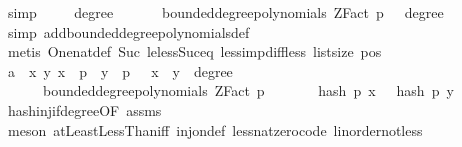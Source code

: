 \begin{isabellebody}
\ simp\isanewline
\ \ \isamarkupfalse%
\ {\isachardoublequoteopen}{\isasymAnd}{\isasymomega}{\isachardot}{\kern0pt}\ degree\ {\isasymomega}\ {\isasymge}\ {}\ {\isasymLongrightarrow}\ {\isasymomega}\ {\isasymin}\ bounded{\isacharunderscore}{\kern0pt}degree{\isacharunderscore}{\kern0pt}polynomials\ {\isacharparenleft}{\kern0pt}ZFact\ p{\isacharparenright}{\kern0pt}\ {}\ {\isasymLongrightarrow}\ degree\ {\isasymomega}\ {\isacharequal}{\kern0pt}\ {}{\isachardoublequoteclose}\isanewline
\ \ \ \ \isamarkupfalse%
\ {\isacharparenleft}{\kern0pt}simp\ add{\isacharcolon}{\kern0pt}bounded{\isacharunderscore}{\kern0pt}degree{\isacharunderscore}{\kern0pt}polynomials{\isacharunderscore}{\kern0pt}def{\isacharparenright}{\kern0pt}\ \isanewline
\ \ \ \ \isamarkupfalse%
\ {\isacharparenleft}{\kern0pt}metis\ One{\isacharunderscore}{\kern0pt}nat{\isacharunderscore}{\kern0pt}def\ Suc{\isacharunderscore}{\kern0pt}{}\ le{\isacharunderscore}{\kern0pt}less{\isacharunderscore}{\kern0pt}Suc{\isacharunderscore}{\kern0pt}eq\ less{\isacharunderscore}{\kern0pt}imp{\isacharunderscore}{\kern0pt}diff{\isacharunderscore}{\kern0pt}less\ list{\isachardot}{\kern0pt}size{\isacharparenleft}{\kern0pt}{}{\isacharparenright}{\kern0pt}\ pos{}{\isacharparenright}{\kern0pt}\isanewline
\ \ \isamarkupfalse%
\ a{}{\isacharcolon}{\kern0pt}\ {\isachardoublequoteopen}{\isasymAnd}{\isasymomega}\ x\ y{\isachardot}{\kern0pt}\ x\ {\isacharless}{\kern0pt}\ p\ {\isasymLongrightarrow}\ y\ {\isacharless}{\kern0pt}\ p\ {\isasymLongrightarrow}\ \ x\ {\isasymnoteq}\ y\ {\isasymLongrightarrow}\ degree\ {\isasymomega}\ {\isasymge}\ {}\ {\isasymLongrightarrow}\ \isanewline
\ \ \ \ {\isasymomega}\ {\isasymin}\ bounded{\isacharunderscore}{\kern0pt}degree{\isacharunderscore}{\kern0pt}polynomials\ {\isacharparenleft}{\kern0pt}ZFact\ p{\isacharparenright}{\kern0pt}\ {}\ {\isasymLongrightarrow}\ \isanewline
\ \ \ \ hash\ p\ x\ {\isasymomega}\ {\isasymnoteq}\ hash\ p\ y\ {\isasymomega}{\isachardoublequoteclose}\ \isanewline
\ \ \ \ \isamarkupfalse%
\ hash{\isacharunderscore}{\kern0pt}inj{\isacharunderscore}{\kern0pt}if{\isacharunderscore}{\kern0pt}degree{\isacharunderscore}{\kern0pt}{}{\isacharbrackleft}{\kern0pt}OF\ assms{\isacharparenleft}{\kern0pt}{}{\isacharparenright}{\kern0pt}{\isacharbrackright}{\kern0pt}\ \isanewline
\ \ \ \ \isamarkupfalse%
\ {\isacharparenleft}{\kern0pt}meson\ atLeastLessThan{\isacharunderscore}{\kern0pt}iff\ inj{\isacharunderscore}{\kern0pt}on{\isacharunderscore}{\kern0pt}def\ less{\isacharunderscore}{\kern0pt}nat{\isacharunderscore}{\kern0pt}zero{\isacharunderscore}{\kern0pt}code\ linorder{\isacharunderscore}{\kern0pt}not{\isacharunderscore}{\kern0pt}less{\isacharparenright}{\kern0pt}\isanewline

\end{isabellebody}
